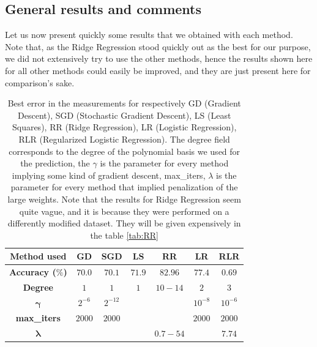 \documentclass[10pt,conference,compsocconf]{IEEEtran}
\begin{document}
\subsection{General results and comments}
Let us now present quickly some results that we obtained with each method. Note that, as the Ridge Regression stood quickly out as the best for our purpose, we did not extensively try to use the other methods, hence the results shown here for all other methods could easily be improved, and they are just present here for comparison's sake.
\begin{table}[!h]
	\centering
	\begin{tabular}{c||c|c|c|c|c|c}
		\textbf{Method used} & GD & SGD & LS & RR & LR & RLR  \\
		\hline
		\textbf{Accuracy ($\%$)} & $70.0$&$70.1$&$71.9$&$82.96$&$77.4$&$0.69$\\
		\hline
		\textbf{Degree} & $1$ &$1$&$1$&$10-14$&$2$&$3$\\
		\hline
		$\mathbf{\gamma}$ & $2^{-6}$&$2^{-12}$&\diagbox{}&\diagbox{}&$10^{-8}$&$10^{-6}$\\
		\hline
		\textbf{max\_iters} & $2000$&$2000$&\diagbox{}&\diagbox{}&$2000$&$2000$\\
		\hline
		$\mathbf{\lambda}$ & \diagbox{}&\diagbox{}&\diagbox{}&$0.7-54$&\diagbox{}&$7.74$\\
		
	\end{tabular}
	
	\caption{Best error in the measurements for respectively GD (Gradient Descent), SGD (Stochastic Gradient Descent), LS (Least Squares), RR (Ridge Regression), LR (Logistic Regression), RLR (Regularized Logistic Regression). The degree field corresponds to the degree of the polynomial basis we used for the prediction, the $\gamma$ is the parameter for every method implying some kind of gradient descent, max\_iters, $\lambda$ is the parameter for every method that implied penalization of the large weights. Note that the results for Ridge Regression seem quite vague, and it is because they were performed on a differently modified dataset. They will be given expensively in the table \ref{tab:RR}}
	\label{tab:results}
\end{table}
\end{document}
